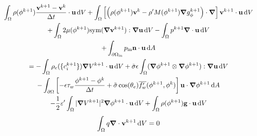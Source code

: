 \documentclass[preprint,pre,superscriptaddress,a4paper]{revtex4-1}
\renewcommand{\v}[1]{\ensuremath{\mathbf{#1}}} %
\newcommand{\gv}[1]{\ensuremath{\mbox{\boldmath$ #1 $}}}
\newcommand{\diff}{\mathrm{d}}
\newcommand{\grad}[1]{\gv{\nabla} #1} %
\renewcommand{\div}[1]{\gv{\nabla} \cdot #1} %
\newcommand{\sym}[1]{\mathrm{sym} #1 }
\newcommand{\inlet}{\mathrm{in}}
\newcommand{\outlet}{\mathrm{out}}
\begin{document}
\begin{multline}
  \int_\Omega \rho(\phi^{k+1}) \frac{\v v^{k+1} - \v v^k}{\Delta t} \cdot \v u \, \diff V
  + \int_\Omega \left[ \left( \rho(\phi^{k+1}) \v v^k - \rho' M(\phi^{k+1}) \grad g_\phi^{k+1} \right) \cdot \grad \right] \v v^{k+1}\cdot \v u \, \diff V \\
  + \int_\Omega 2\mu(\phi^{k+1}) \sym(\grad \v v^{k+1}) : \grad \v u \, \diff V
  - \int_\Omega p^{k+1} \div \v u \, \diff V \\
  + \int_{\partial\Omega_\inlet} p_\inlet \v n \cdot \v u \, \diff A \\
  = - \int_\Omega \rho_e (\{ c_i^{k+1} \}) \grad V^{k+1} \cdot \v u \, \diff V
  + \tilde\sigma\epsilon \int_\Omega ( \grad \phi^{k+1} \otimes \grad \phi^{k+1} ) : \grad \v u \, \diff V \\
  - \int_{\partial\Omega} \left[ - \epsilon \tau_w \frac{\phi^{k+1}-\phi^k}{\Delta t}  + \tilde\sigma\cos(\theta_e) \overline{f_w'}(\phi^{k+1}, \phi^{k}) \right] \v u \cdot \grad\phi^{k+1} \, \diff A\\
  - \frac{1}{2} \varepsilon' \int_\Omega |\grad V^{k+1}|^2 \grad\phi^{k+1} \cdot \v u \, \diff V
  + \int_\Omega \rho(\phi^{k+1})\v g \cdot \v u \, \diff V
\end{multline}
\begin{equation}
  \int_\Omega q \div \v v^{k+1} \, \diff V = 0
\end{equation}



\end{document}
